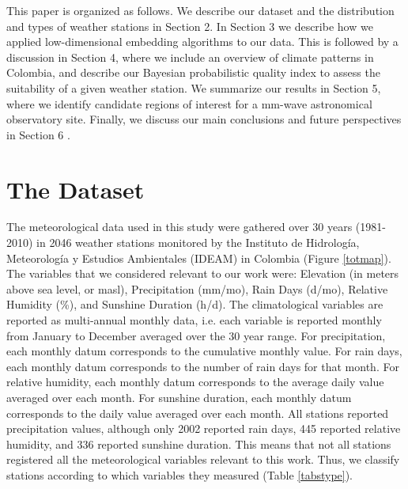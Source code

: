 \documentclass[a4paper,fleqn,usenatbib]{mnras}
\begin{document}
This paper is organized as follows. We describe our dataset and the distribution and types of weather stations in Section 2. In Section 3 we describe how we applied low-dimensional embedding algorithms to our data. This is followed by a discussion in Section 4, where we include an overview of climate patterns in Colombia, and describe our Bayesian probabilistic quality index to assess the suitability of a given weather station. We summarize our results in Section 5, where we identify candidate regions of interest for a mm-wave astronomical observatory site. Finally, we discuss our main conclusions and future perspectives in Section 6 .
  
  
\section{The Dataset}

The meteorological data used in this study were gathered over 30 years (1981-2010) in 2046 weather stations monitored by the Instituto de Hidrolog\'ia, Meteorolog\'ia y Estudios Ambientales (IDEAM) in Colombia (Figure \ref{totmap}). The  variables that we considered relevant to our work were: Elevation (in meters above sea level, or masl), Precipitation (mm/mo), Rain Days (d/mo),  Relative Humidity (\%), and Sunshine Duration (h/d). The climatological variables are reported as multi-annual monthly data, i.e. each variable is reported monthly from January to December averaged over the 30 year range. For precipitation, each monthly datum corresponds to the cumulative monthly value.  For rain days, each monthly datum corresponds to the number of rain days for that month.  For relative humidity, each monthly datum corresponds to the  average daily value averaged over each month. For sunshine duration, each monthly datum corresponds to the daily value averaged over each month. All stations reported precipitation values, although only 2002 reported rain days, 445 reported relative humidity, and 336 reported sunshine duration. This means that not all stations registered all the meteorological variables relevant to this work. Thus, we classify stations according to which variables they measured (Table \ref{tabstype}).\\
\end{document}
